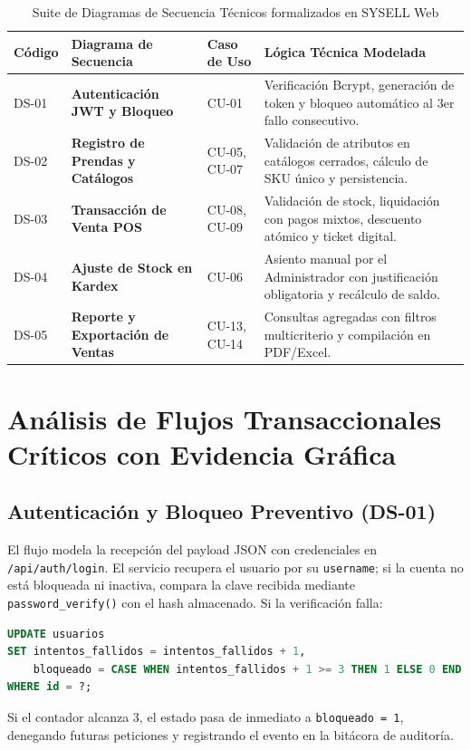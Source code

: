 \begin{table}[H]
\centering
\small
\begin{tabularx}{\textwidth}{>{\ttfamily\centering}p{1.4cm} >{\raggedright\bfseries}p{4cm} >{\ttfamily\centering}p{1.8cm} Y}
\toprule
\textbf{Código} & \textbf{Diagrama de Secuencia} & \textbf{Caso de Uso} & \textbf{Lógica Técnica Modelada} \\
\midrule
DS-01 & Autenticación JWT y Bloqueo & CU-01 & Verificación Bcrypt, generación de token y bloqueo automático al 3er fallo consecutivo. \\
\addlinespace
DS-02 & Registro de Prendas y Catálogos & CU-05, CU-07 & Validación de atributos en catálogos cerrados, cálculo de SKU único y persistencia. \\
\addlinespace
DS-03 & Transacción de Venta POS & CU-08, CU-09 & Validación de stock, liquidación con pagos mixtos, descuento atómico y ticket digital. \\
\addlinespace
DS-04 & Ajuste de Stock en Kardex & CU-06 & Asiento manual por el Administrador con justificación obligatoria y recálculo de saldo. \\
\addlinespace
DS-05 & Reporte y Exportación de Ventas & CU-13, CU-14 & Consultas agregadas con filtros multicriterio y compilación en PDF/Excel. \\
\bottomrule
\end{tabularx}
\caption{Suite de Diagramas de Secuencia Técnicos formalizados en SYSELL Web}
\label{tab:diagramas_secuencia}
\end{table}

\section{Análisis de Flujos Transaccionales Críticos con Evidencia Gráfica}

\subsection{Autenticación y Bloqueo Preventivo (DS-01)}
El flujo modela la recepción del payload JSON con credenciales en \texttt{/api/auth/login}. El servicio recupera el usuario por su \texttt{username}; si la cuenta no está bloqueada ni inactiva, compara la clave recibida mediante \texttt{password\_verify()} con el hash almacenado. Si la verificación falla:
\begin{lstlisting}[language=SQL]
UPDATE usuarios 
SET intentos_fallidos = intentos_fallidos + 1,
    bloqueado = CASE WHEN intentos_fallidos + 1 >= 3 THEN 1 ELSE 0 END
WHERE id = ?;
\end{lstlisting}
Si el contador alcanza 3, el estado pasa de inmediato a \texttt{bloqueado = 1}, denegando futuras peticiones y registrando el evento en la bitácora de auditoría.

